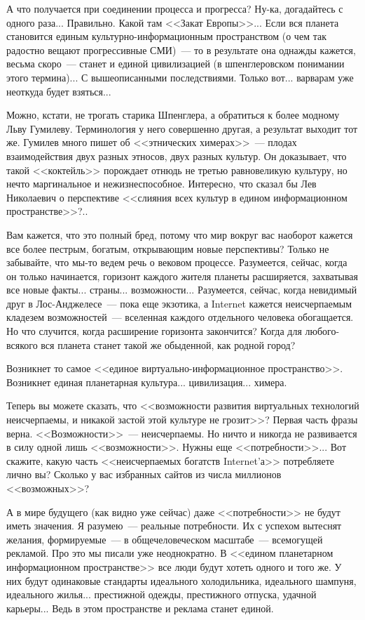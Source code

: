 \documentclass{scrbook}
\newcommand{\flqq}{<<}
\newcommand{\frqq}{>>}
\newcommand{\mdash}{~--- }
\begin{document}
А что получается при соединении процесса и прогресса? Ну-ка, догадайтесь с одного раза... Правильно. Какой там {\flqq}Закат Европы{\frqq}... Если вся планета становится единым культурно-информационным пространством (о чем так радостно вещают прогрессивные СМИ){\mdash}то в результате она однажды кажется, весьма скоро{\mdash}станет и единой цивилизацией (в шпенглеровском понимании этого термина)... С вышеописанными последствиями. Только вот... варварам уже неоткуда будет взяться...

Можно, кстати, не трогать старика Шпенглера, а обратиться к более модному Льву Гумилеву. Терминология у него совершенно другая, а результат выходит тот же. Гумилев много пишет об {\flqq}этнических химерах{\frqq}{\mdash}плодах взаимодействия двух разных этносов, двух разных культур. Он доказывает, что такой {\flqq}коктейль{\frqq} порождает отнюдь не третью равновеликую культуру, но нечто маргинальное и нежизнеспособное. Интересно, что сказал бы Лев Николаевич о перспективе {\flqq}слияния всех культур в едином информационном пространстве{\frqq}?..

Вам кажется, что это полный бред, потому что мир вокруг вас наоборот кажется все более пестрым, богатым, открывающим новые перспективы? Только не забывайте, что мы-то ведем речь о вековом процессе. Разумеется, сейчас, когда он только начинается, горизонт каждого жителя планеты расширяется, захватывая все новые факты... страны... возможности... Разумеется, сейчас, когда невидимый друг в Лос-Анджелесе{\mdash}пока еще экзотика, а Internet кажется неисчерпаемым кладезем возможностей{\mdash}вселенная каждого отдельного человека обогащается. Но что случится, когда расширение горизонта закончится? Когда для любого-всякого вся планета станет такой же обыденной, как родной город?

Возникнет то самое {\flqq}единое виртуально-информационное пространство{\frqq}. Возникнет единая планетарная культура... цивилизация... химера.

Теперь вы можете сказать, что {\flqq}возможности развития виртуальных технологий неисчерпаемы, и никакой застой этой культуре не грозит{\frqq}? Первая часть фразы верна. {\flqq}Возможности{\frqq}{\mdash}неисчерпаемы. Но ничто и никогда не развивается в силу одной лишь {\flqq}возможности{\frqq}. Нужны еще {\flqq}потребности{\frqq}... Вот скажите, какую часть {\flqq}неисчерпаемых богатств Internet'а{\frqq} потребляете лично вы? Сколько у вас избранных сайтов из числа миллионов {\flqq}возможных{\frqq}?

А в мире будущего (как видно уже сейчас) даже {\flqq}потребности{\frqq} не будут иметь значения. Я разумею{\mdash}реальные потребности. Их с успехом вытеснят желания, формируемые{\mdash}в общечеловеческом масштабе{\mdash}всемогущей рекламой. Про это мы писали уже неоднократно. В {\flqq}едином планетарном информационном пространстве{\frqq} все люди будут хотеть одного и того же. У них будут одинаковые стандарты идеального холодильника, идеального шампуня, идеального жилья... престижной одежды, престижного отпуска, удачной карьеры... Ведь в этом пространстве и реклама станет единой.
\end{document}
